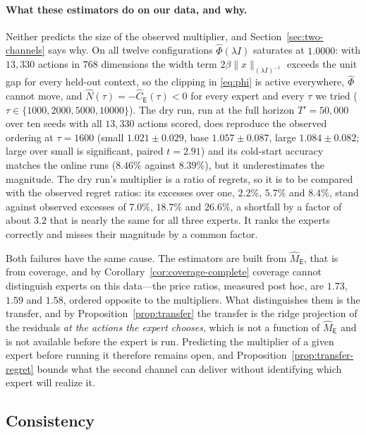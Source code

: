 \documentclass{article}
\theoremstyle{definition}
\theoremstyle{remark}
\theoremstyle{remark}
\newcommand{\Exp}{\mathsf{E}}
\begin{document}
\paragraph{What these estimators do on our data, and why.}
Neither predicts the size of the observed multiplier, and
Section~\ref{sec:two-channels} says why. On all twelve configurations
$\widehat\Phi(\lambda I)$ saturates at $1.0000$: with $13{,}330$ actions in
$768$ dimensions the width term $2\beta\|x\|_{(\lambda I)^{-1}}$ exceeds the
unit gap for every held-out context, so the clipping in \eqref{eq:phi} is
active everywhere, $\widehat\Phi$ cannot move, and $\widehat N(\tau)=-\widehat
C_{\Exp}(\tau)<0$ for every expert and every $\tau$ we tried
($\tau\in\{1000,2000,5000,10000\}$). The dry run, run at the full horizon
$T'=50{,}000$ over ten seeds with all $13{,}330$ actions scored, does reproduce
the observed ordering at $\tau=1600$ (small $1.021\pm0.029$, base
$1.057\pm0.087$, large $1.084\pm0.082$; large over small is significant,
paired $t=2.91$) and its cold-start accuracy matches the online runs
($8.46\%$ against $8.39\%$), but it underestimates the magnitude. The dry
run's multiplier is a ratio of regrets, so it is to be compared with the
observed regret ratios: its excesses over one, $2.2\%$, $5.7\%$ and $8.4\%$,
stand against observed excesses of $7.0\%$, $18.7\%$ and $26.6\%$, a shortfall
by a factor of about $3.2$ that is nearly the same for all three experts. It
ranks the experts correctly and misses their magnitude by a common factor.

Both failures have the same cause. The estimators are built from $\widehat
M_{\Exp}$, that is from coverage, and by
Corollary~\ref{cor:coverage-complete} coverage cannot distinguish experts on
this data---the price ratios, measured post hoc, are $1.73$, $1.59$ and
$1.58$, ordered opposite to the multipliers. What distinguishes them is the transfer, and by
Proposition~\ref{prop:transfer} the transfer is the ridge projection of the
residuals \emph{at the actions the expert chooses}, which is not a function of
$\widehat M_{\Exp}$ and is not available before the expert is run. Predicting
the multiplier of a given expert before running it therefore remains open, and
Proposition~\ref{prop:transfer-regret} bounds what the second channel can
deliver without identifying which expert will realize it.

\subsection{Consistency}
\label{app:consistency}
\end{document}
